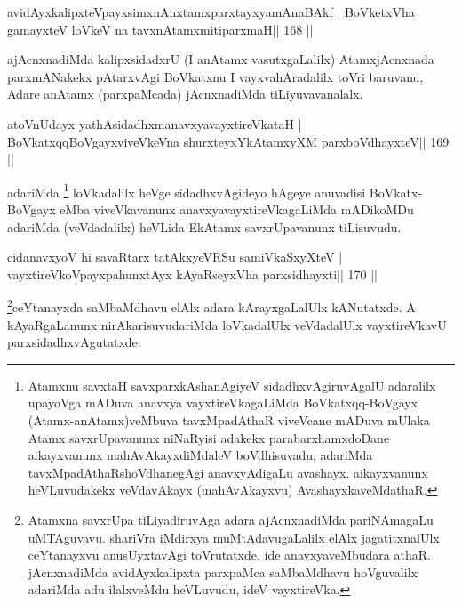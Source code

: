 \begin{shl}
avidAyxkalipxteV\s payxsimxnAnxtamxparxtayxyamAnaBAkf |
BoVketxVha gamayxteV loVkeV na tavxnAtamxmitiparxmaH\hfill || 168 ||
\end{shl}

\begin{artha}
ajAcnxnadiMda kalipxsidadxrU (I anAtamx vasutxgaLalilx) AtamxjAcnxnada  parxmANakekx pAtarxvAgi BoVkatxnu I vayxvahAradalilx toVri baruvanu, Adare anAtamx (parxpaMcada) jAcnxnadiMda tiLiyuvavanalalx.
\end{artha}

\begin{shl}
atoV\s nUdayx yathAsidadhxmanavxyavayxtireVkataH |
BoVkatxqqBoVgayxviveVkeVna shurxteyxYkAtamxyXM parxboVdhayxteV\hfill || 169 ||
\end{shl}

\begin{artha}
adariMda \footnote[10]{Atamxnu savxtaH savxparxkAshanAgiyeV  sidadhxvAgiruvAgalU adaralilx upayoVga mADuva anavxya vayxtireVkagaLiMda BoVkatxqq-BoVgayx (Atamx-anAtamx)veMbuva tavxMpadAthaR viveVcane mADuva mUlaka Atamx savxrUpavanunx niNaRyisi adakekx parabarxhamxdoDane aikayxvanunx mahAvAkayxdiMdaleV boVdhisuvadu, adariMda tavxMpadAthaRshoVdhanegAgi anavxyAdigaLu avashayx. aikayxvanunx heVLuvudakekx veVdavAkayx (mahAvAkayxvu) AvashayxkaveMdathaR.} loVkadalilx heVge sidadhxvAgideyo hAgeye anuvadisi BoVkatx- BoVgayx eMba viveVkavanunx anavxyavayxtireVkagaLiMda mADikoMDu adariMda (veVdadalilx) heVLida EkAtamx savxrUpavanunx tiLisuvudu.
\end{artha}


\begin{shl}
cidanavxyoV hi savaRtarx tatAkxyeVRSu samiVkaSxyXteV |
vayxtireVkoV\s payxpahunxtAyx kAyaRseyxVha parxsidhayxti\hfill || 170 ||
\end{shl}

\begin{artha}
\footnote[11]{Atamxna savxrUpa tiLiyadiruvAga adara ajAcnxnadiMda 
pariNAmagaLu uMTAguvavu. shariVra iMdirxya muMtAdavugaLalilx elAlx 
jagatitxnalUlx ceYtanayxvu anusUyxtavAgi toVrutatxde. ide 
anavxyaveMbudara athaR. jAcnxnadiMda avidAyxkalipxta parxpaMca 
saMbaMdhavu hoVguvalilx adariMda adu ilalxveMdu heVLuvudu, ideV vayxtireVka.}ceYtanayxda saMbaMdhavu elAlx adara kArayxgaLalUlx kANutatxde. A kAyaRgaLanunx nirAkarisuvudariMda loVkadalUlx veVdadalUlx vayxtireVkavU parxsidadhxvAgutatxde.
\end{artha}

